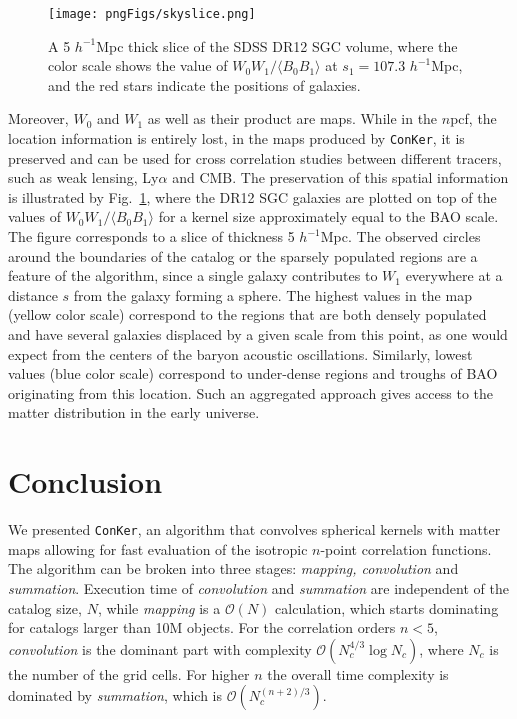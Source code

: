 \documentclass{aa}
\begin{document}
\begin{figure}
\texttt{[image: pngFigs/skyslice.png]}
\caption{A 5 $h^{-1}$Mpc thick slice of the SDSS DR12 SGC volume, where the color scale shows the value of $W_0 W_1 / \langle B_0 B_1 \rangle$ at $s_1 = 107.3$ $h^{-1}$Mpc, and the red stars indicate the positions of galaxies.}
\label{fig:skyslice}
\end{figure}

Moreover, $W_0$ and $W_1$ as well as their product are maps. While in the $n$pcf, the location information is entirely lost, in the maps produced by {\tt ConKer}, it is preserved and can be used for cross correlation studies between different tracers, such as weak lensing, Ly$\alpha$ and CMB. The preservation of this spatial information is illustrated by Fig.~\ref{fig:skyslice}, where the DR12 SGC galaxies are plotted on top of the values of $W_0 W_1 / \langle B_0 B_1 \rangle$ for a kernel size approximately equal to the BAO scale. The figure corresponds to a slice of thickness 5 $h^{-1}$Mpc. The observed circles around the boundaries of the catalog or the sparsely populated regions are a feature of the algorithm, since a single galaxy contributes to $W_1$ everywhere at a distance $s$ from the galaxy  forming a sphere. The highest values  in the map (yellow color scale) correspond to the regions that are both densely populated and have several galaxies displaced by a given scale from this point, as one would expect from the centers of the baryon acoustic oscillations. Similarly, lowest values (blue color scale) correspond to under-dense regions and troughs of BAO originating from this location. Such an aggregated approach gives access to the matter distribution in the early universe. 

\section{Conclusion}

We presented {\tt ConKer}, an algorithm that convolves spherical kernels with matter maps allowing for fast evaluation of the isotropic $n$-point correlation functions. The algorithm can be broken into three stages: \textit { mapping, convolution} and \textit {summation}. Execution time of \textit {convolution} and \textit {summation} are independent of the catalog size, $N$, while \textit {mapping} is a $\mathcal{O}(N)$ calculation, which starts dominating for catalogs larger than 10M objects. For the correlation orders $n<5$,  \textit {convolution} is the dominant part with complexity $\mathcal{O}(N_c^{4/3} \log N_c)$, where $N_c$ is the number of the grid cells. For higher $n$ the overall time complexity is dominated by \textit {summation}, which is $\mathcal{O}(N_c^{(n+2)/3})$. 
\end{document}
